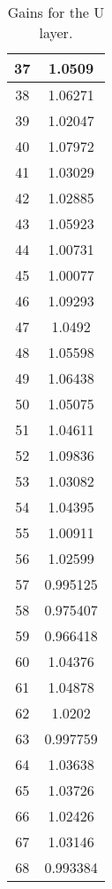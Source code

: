 \begin{table}[h]
\begin{subtable}[h]{2in}
{\begin{tabular}{|c|c|}
37	&	1.0509	\\	\hline
38	&	1.06271	\\	\hline
39	&	1.02047	\\	\hline
40	&	1.07972	\\	\hline
41	&	1.03029	\\	\hline
42	&	1.02885	\\	\hline
43	&	1.05923	\\	\hline
44	&	1.00731	\\	\hline
45	&	1.00077	\\	\hline
46	&	1.09293	\\	\hline
47	&	1.0492	\\	\hline
48	&	1.05598	\\	\hline
49	&	1.06438	\\	\hline
50	&	1.05075	\\	\hline
51	&	1.04611	\\	\hline
52	&	1.09836	\\	\hline
53	&	1.03082	\\	\hline
54	&	1.04395	\\	\hline
55	&	1.00911	\\	\hline
56	&	1.02599	\\	\hline
57	&	0.995125	\\	\hline
58	&	0.975407	\\	\hline
59	&	0.966418	\\	\hline
60	&	1.04376	\\	\hline
61	&	1.04878	\\	\hline
62	&	1.0202	\\	\hline
63	&	0.997759	\\	\hline
64	&	1.03638	\\	\hline
65	&	1.03726	\\	\hline
66	&	1.02426	\\	\hline
67	&	1.03146	\\	\hline
68	&	0.993384	\\	\hline
        \end{tabular}
        }
        \caption{Gains for the U layer.}
    \end{subtable}
    \quad
    \begin{subtable}[h]{2in}
        \centering{}
\end{subtable}
\end{table}
